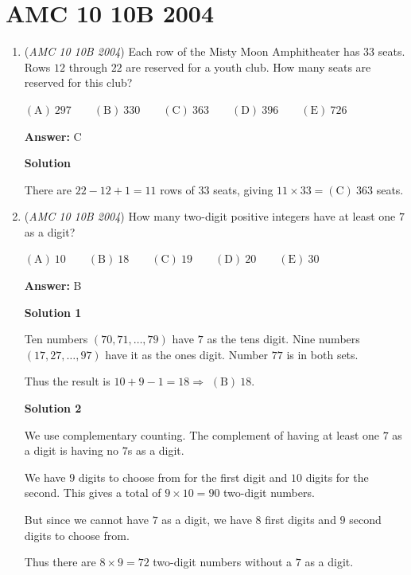 \section{AMC 10 10B 2004}
        \begin{enumerate}
        	\item (\textit{AMC 10 10B 2004}) Each row of the Misty Moon Amphitheater has $33$ seats. Rows $12$ through $22$ are reserved for a youth club. How many seats are reserved for this club?


 $\mathrm{(A) \ } 297 \qquad \mathrm{(B) \ } 330\qquad \mathrm{(C) \ } 363\qquad \mathrm{(D) \ } 396\qquad \mathrm{(E) \ } 726$

 \textbf{Answer: }C



\textbf{Solution}

There are $22-12+1=11$ rows of $33$ seats, giving $11\times 33=\boxed{\mathrm{(C)}\ 363}$ seats.

 


	\item (\textit{AMC 10 10B 2004}) How many two-digit positive integers have at least one $7$ as a digit?


 $\mathrm{(A) \ } 10 \qquad \mathrm{(B) \ } 18\qquad \mathrm{(C) \ } 19 \qquad \mathrm{(D) \ } 20\qquad \mathrm{(E) \ } 30$

 \textbf{Answer: }B



\textbf{Solution 1}

Ten numbers $(70,71,\dots,79)$ have $7$ as the tens digit. Nine numbers $(17,27,\dots,97)$ have it as the ones digit. Number $77$ is in both sets.

 Thus the result is $10+9-1=18 \Rightarrow$ $\boxed{\mathrm{(B)}\ 18}$.

 



\textbf{Solution 2}

We use complementary counting. The complement of having at least one $7$ as a digit is having no $7$s as a digit.

 We have $9$ digits to choose from for the first digit and $10$ digits for the second. This gives a total of $9 \times 10 = 90$ two-digit numbers.

 But since we cannot have $7$ as a digit, we have $8$ first digits and $9$ second digits to choose from.

 Thus there are $8 \times 9 = 72$ two-digit numbers without a $7$ as a digit.


\end{enumerate}
